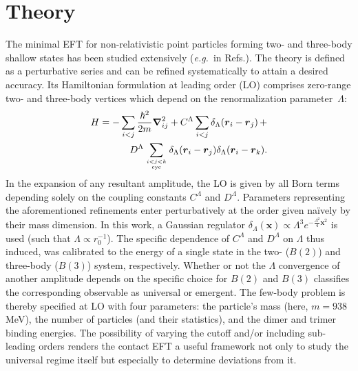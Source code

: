 \documentclass[onecolumn,preprint,superscriptaddress,nofootinbib]{revtex4-1}
\newcommand{\lec}{C^\Lambda}
\newcommand{\led}{D^\Lambda}
\newcommand{\eg}{\textit{e.g.}~}
\newcommand{\ve}[1]{\ensuremath{\boldsymbol{#1}}}
\begin{document}
\section*{Theory}
The minimal EFT for non-relativistic point particles forming two- and three-body shallow states has been studied extensively (\eg in Refs.\cite{Lepage:1997cs,vanKolck:1999mw, Bedaque:1998kg, Braaten:2004rn, Hammer:2017tjm, Hammer:2019poc}).
The theory is defined as a perturbative series and can be refined systematically to attain a desired accuracy.
Its Hamiltonian formulation at leading order (LO) comprises zero-range two- and three-body vertices which depend on the renormalization parameter~$\Lambda$:
%
\begin{align}
H = - \sum_{i<j} \frac{\hbar^2}{2m}\ve{\nabla}_{ij}^2+ \lec \sum_{i<j}{\delta_\Lambda(\ve{r}_i-\ve{r}_j)} 
\,+\nonumber\\
\led \sum_{ i<j<k \atop \text{cyc} }\delta_\Lambda(\ve{r}_i-\ve{r}_j)\delta_\Lambda(\ve{r}_i-\ve{r}_k).
\label{eq:hamiltonian}
\end{align}
%
In the expansion of any resultant amplitude, the LO is given by all Born
terms depending solely on the coupling constants $\lec$ and $\led$. 
Parameters representing the aforementioned refinements
enter perturbatively at the order given na\"ively by their mass
dimension. 
In this work, a Gaussian regulator 
\mbox{$\delta_\Lambda(\ve{x}) \propto\Lambda^3 e^{-\frac{\Lambda^2}{4}\ve{x}^2}$} is used (such that $\Lambda\propto r_0^{-1}$).
The specific dependence of $\lec$ and $\led$ on $\Lambda$ thus induced, was calibrated to
the energy of a single state in the two- ($B(2)$) and three-body
($B(3)$) system, respectively.
Whether or not the $\Lambda$ convergence of another amplitude depends on the
specific choice for $B(2)$ and $B(3)$ classifies the corresponding observable as
universal or emergent.
The few-body problem is thereby specified at LO with four parameters: the particle's mass
(here, $m=938~$MeV), the number of particles 
(and their statistics),
and the dimer and trimer binding energies.
The possibility of varying the cutoff and/or including sub-leading orders renders the contact EFT
a useful framework 
not only to study the universal regime itself but especially to determine deviations from it.
\end{document}
